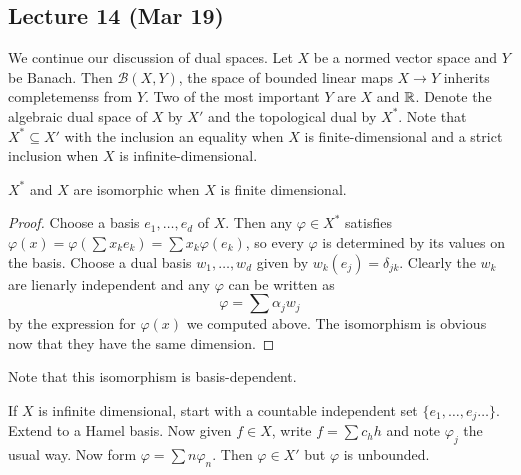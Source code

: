 \documentclass[10pt, twoside]{article}
\begin{document}
    \subsection{Lecture 14 (Mar 19)}

    We continue our discussion of dual spaces. Let $X$ be a normed vector space
    and $Y$ be Banach. Then $\mathcal{B}(X,Y)$, the space of bounded linear
    maps $X \to Y$ inherits completemenss from $Y$. Two of the most important
    $Y$ are $X$ and $\mathbb{R}$. Denote the algebraic dual space of $X$ by $X'$ and
    the topological dual by $X^*$. Note that $X^* \subseteq X'$ with the
    inclusion an equality when $X$ is finite-dimensional and a strict inclusion
    when $X$ is infinite-dimensional. 

    \begin{lem} $X^*$ and $X$ are isomorphic when $X$ is finite dimensional.
        \begin{proof} Choose a basis $e_1, \ldots, e_d$ of $X$. Then any
            $\varphi \in X^*$ satisfies $\varphi(x) = \varphi \left( \sum
            x_ke_k \right) = \sum x_k \varphi(e_k)$, so every $\varphi$ is
            determined by its values on the basis. Choose a dual basis $w_1,
            \ldots, w_d$ given by $w_k(e_j) = \delta_{jk}$. Clearly the $w_k$
            are lienarly independent and any $\varphi$ can be written as
            \[\varphi = \sum \alpha_j w_j\] by the expression for $\varphi(x)$
            we computed above. The isomorphism is obvious now that they have
            the same dimension.  \end{proof} \end{lem}

    \begin{rmk} Note that this isomorphism is basis-dependent.  \end{rmk}

    \begin{exm} If $X$ is infinite dimensional, start with a countable
        independent set $\{e_1, \ldots, e_j \ldots \}$. Extend to a Hamel
        basis. Now given $f \in X$, write $f = \sum c_h h$ and note $\varphi_j$
        the usual way. Now form $\varphi = \sum n \varphi_n$. Then $\varphi \in
        X'$ but $\varphi$ is unbounded.  \end{exm}
\end{document}
